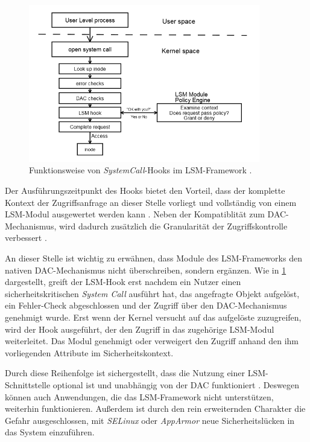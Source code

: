 \documentclass[../main.tex]{subfiles}
\begin{document}
			\begin{figure}[h]
					\centering
					\includegraphics[width=0.9\textwidth]{./images/sec_LSMHook.jpg}
					\caption{Funktionsweise von \emph{\gls{SystemCall}}-Hooks im LSM-Framework \cite[S.3]{LSMFramework}.}
					\label{fig:sec_LSMHook}
			\end{figure}

			Der Ausführungszeitpunkt des Hooks bietet den Vorteil, dass der komplette Kontext der Zugriffsanfrage an dieser Stelle vorliegt und vollständig von einem LSM-Modul ausgewertet werden kann \cite[S.2]{LSMFramework}. Neben der Kompatiblität zum DAC-Mechanismus, wird dadurch zusätzlich die Granularität der Zugriffskontrolle verbessert \cite{LSMDesign}.

			An dieser Stelle ist wichtig zu erwähnen, dass Module des LSM-Frameworks den nativen DAC-Mechanismus nicht überschreiben, sondern ergänzen. Wie in \fig \ref{fig:sec_LSMHook} dargestellt, greift der LSM-Hook erst nachdem ein Nutzer einen sicherheitskritischen \emph{System Call} ausführt hat, das angefragte Objekt aufgelöst, ein Fehler-Check abgeschlossen und der Zugriff über den DAC-Mechanismus genehmigt wurde. Erst wenn der Kernel versucht auf das aufgelöste  zuzugreifen, wird der Hook ausgeführt, der den Zugriff in das zugehörige LSM-Modul weiterleitet. Das Modul genehmigt oder verweigert den Zugriff anhand den ihm vorliegenden Attribute im Sicherheitskontext.

			Durch diese Reihenfolge ist sichergestellt, dass die Nutzung einer LSM-Schnittstelle optional ist und unabhängig von der DAC funktioniert \cite{centOsMCS}. Deswegen können auch Anwendungen, die das LSM-Framework nicht unterstützen, weiterhin funktionieren. Außerdem ist durch den rein erweiternden Charakter die Gefahr ausgeschlossen, mit \emph{SELinux} oder \emph{AppArmor} neue Sicherheitslücken in das System einzuführen.
\end{document}
